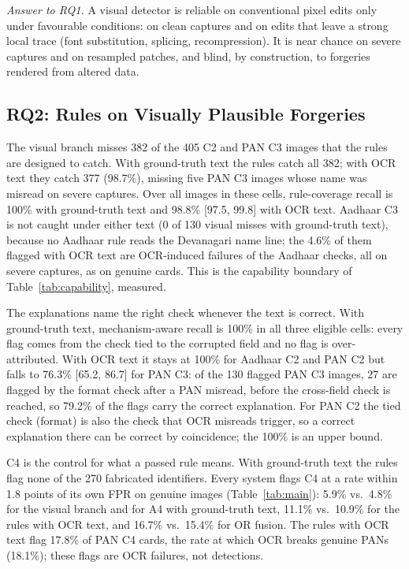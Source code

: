 \documentclass[conference]{IEEEtran}
\begin{document}
\emph{Answer to RQ1.} A visual detector is reliable on conventional
pixel edits only under favourable conditions: on clean captures and on
edits that leave a strong local trace (font substitution, splicing,
recompression). It is near chance on
severe captures and on resampled patches, and blind, by construction,
to forgeries rendered from altered data.

\subsection{RQ2: Rules on Visually Plausible Forgeries}
\label{subsec:res-rq2}

The visual branch misses 382 of the 405 C2 and PAN C3 images that the
rules are designed to catch. With ground-truth text the rules catch all
382; with OCR text they catch 377 (98.7\%), missing five PAN C3 images
whose name was misread on severe captures. Over all images in these
cells, rule-coverage recall is 100\% with ground-truth text and 98.8\%
[97.5, 99.8] with OCR text. Aadhaar C3 is not caught under either text
(0 of 130 visual misses with ground-truth text), because no Aadhaar rule
reads the Devanagari name line; the 4.6\% of them flagged with OCR
text are OCR-induced failures of the Aadhaar checks, all on severe
captures, as on genuine cards. This is the capability boundary of Table~\ref{tab:capability},
measured.

The explanations name the right check whenever the text is correct.
With ground-truth text, mechanism-aware recall is 100\% in all three
eligible cells: every flag comes from the check tied to the corrupted
field and no flag is over-attributed. With OCR text it stays at 100\%
for Aadhaar C2 and PAN C2 but falls to 76.3\% [65.2, 86.7] for PAN C3:
of the 130 flagged PAN C3 images, 27 are flagged by the format check
after a PAN misread, before the cross-field check is reached, so 79.2\%
of the flags carry the correct explanation. For PAN C2 the tied check
(format) is also the check that OCR misreads trigger, so a correct
explanation there can be correct by coincidence; the 100\% is an upper
bound.

C4 is the control for what a passed rule means. With ground-truth text
the rules flag none of the 270 fabricated identifiers. Every system
flags C4 at a rate within 1.8 points of its own FPR on genuine images
(Table~\ref{tab:main}): 5.9\% vs.\ 4.8\% for the visual branch and for A4
with ground-truth text, 11.1\% vs.\ 10.9\% for the rules with OCR text,
and 16.7\% vs.\ 15.4\% for OR fusion. The rules with OCR text flag 17.8\% of PAN C4
cards, the rate at which OCR breaks genuine PANs (18.1\%); these flags
are OCR failures, not detections.
\end{document}

